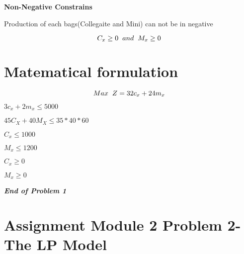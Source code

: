 \documentclass[
]{article}
\begin{document}
\textbf{Non-Negative Constrains}

Production of each bags(Collegaite and Mini) can not be in negative

\[ C_x \ge 0 \hspace{.2cm} and \hspace{.2cm} M_x \ge 0 \]

\hypertarget{matematical-formulation}{%
\section{Matematical formulation}\label{matematical-formulation}}

\[ Max \hspace{.2cm} Z = 32c_x+24m_x \]

\(3c_x+2m_x \le 5000\)

\(45C_X+40M_X \le 35*40*60\)

\(C_x \le 1000\)

\(M_x \le 1200\)

\(C_x \ge 0\)

\(M_x \ge 0\)

\textbf{\emph{End of Problem 1}}

\hypertarget{assignment-module-2-problem-2--the-lp-model}{%
\section{Assignment Module 2 Problem 2- The LP
Model}\label{assignment-module-2-problem-2--the-lp-model}}
\end{document}
